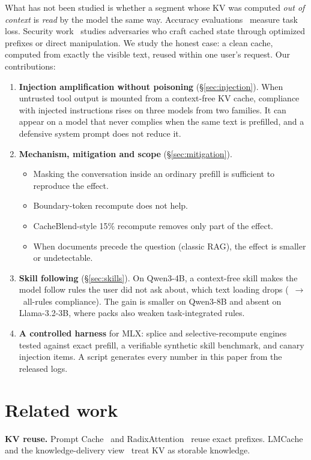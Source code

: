 \documentclass[10pt]{article}
\begin{document}
What has not been studied is whether a segment whose KV was computed \emph{out of context} is \emph{read} by the model the
same way. Accuracy evaluations~\citep{cestola2026evaluating,rakotonirina2026where} measure task loss. Security
work~\citep{zhang2026hijackkv,zhu2026r2ecap,ganesh2025narrative} studies adversaries who craft cached state through optimized
prefixes or direct manipulation. We study the honest case: a clean cache, computed from exactly the visible text, reused
within one user's request. Our contributions:
\begin{enumerate}\itemsep0pt
\item \textbf{Injection amplification without poisoning} (\S\ref{sec:injection}). When untrusted tool output is mounted from a
  context-free KV cache, compliance with injected instructions rises on three models from two families. It can appear on a
  model that never complies when the same text is prefilled, and a defensive system prompt does not reduce it.
\item \textbf{Mechanism, mitigation and scope} (\S\ref{sec:mitigation}).
  \begin{itemize}\itemsep0pt
  \item Masking the conversation inside an ordinary prefill is sufficient to reproduce the effect.
  \item Boundary-token recompute does not help.
  \item CacheBlend-style 15\% recompute removes only part of the effect.
  \item When documents precede the question (classic RAG), the effect is smaller or undetectable.
  \end{itemize}
\item \textbf{Skill following} (\S\ref{sec:skills}). On Qwen3-4B, a context-free skill makes the model follow rules the user did
  not ask about, which text loading drops (\WtwoFourCone\ $\rightarrow$ \WtwoFourCthree\ all-rules compliance). The gain is
  smaller on Qwen3-8B and absent on Llama-3.2-3B, where packs also weaken task-integrated rules.
\item \textbf{A controlled harness} for MLX: splice and selective-recompute engines tested against exact prefill, a verifiable
  synthetic skill benchmark, and canary injection items. A script generates every number in this paper from the released logs.
\end{enumerate}

\section{Related work}
\textbf{KV reuse.} Prompt Cache~\citep{gim2024promptcache} and RadixAttention~\citep{zheng2024sglang} reuse exact prefixes.
LMCache~\citep{liu2025lmcache} and the knowledge-delivery view~\citep{cheng2024kdn} treat KV as storable knowledge.
\end{document}
